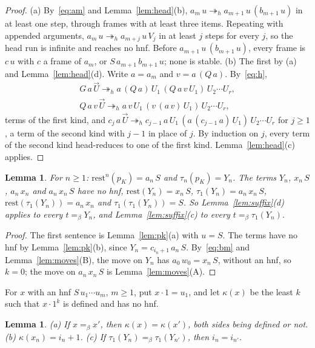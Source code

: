 \documentclass[11pt]{amsart}
\newtheorem{lemma}[theorem]{Lemma}
\theoremstyle{definition}
\newcommand{\hred}{\twoheadrightarrow_h}
\newcommand{\conv}{=_\beta}
\newcommand{\rest}{\mathrm{rest}}
\newcommand{\pK}{p_K}
\newcommand{\vU}{\vec U}
\begin{document}
\begin{proof}
(a) By~\eqref{eq:am} and Lemma~\ref{lem:head}(b), $a_m\,u\hred a_{m+1}\,u\,(b_{m+1}\,u)$ in at least
one step, through frames with at least three items. Repeating with appended arguments,
$a_m\,u\hred a_{m+j}\,u\,V_j$ in at least $j$ steps for every $j$, so the head run is infinite and
reaches no hnf. Before $a_{m+1}\,u\,(b_{m+1}\,u)$, every frame is $c\,u$ with $c$ a frame of $a_m$, or
$S\,a_{m+1}\,b_{m+1}\,u$; none is stable. (b) The first by (a) and Lemma~\ref{lem:head}(d). Write
$a=a_m$ and $v=a\,(Q\,a)$. By~\eqref{eq:h},
\begin{gather*}
G\,a\,\vU\hred a\,(Q\,a)\,U_1\,(Q\,a\,v\,U_1)\,U_2\cdots U_r,\\
Q\,a\,v\,\vU\hred a\,v\,U_1\,(v\,(a\,v)\,U_1)\,U_2\cdots U_r,
\end{gather*}
terms of the first kind, and
$c_{j}\,a\,\vU\hred c_{j-1}\,a\,U_1\,(a\,(c_{j-1}\,a)\,U_1)\,U_2\cdots U_r$ for $j\ge1$, a term of
the second kind with $j-1$ in place of $j$. By induction on $j$, every term of the second kind
head-reduces to one of the first kind. Lemma~\ref{lem:head}(c) applies.
\end{proof}

\begin{lemma}\label{lem:teeth}
For $n\ge1$: $\rest^{n}(\pK)=a_{n}\,S$ and $\tau_n(\pK)=Y_n$. The terms $Y_n$, $x_n\,S$, $a_n\,x_n$
and $a_n\,x_n\,S$ have no hnf, $\rest(Y_n)=x_n\,S$, $\tau_1(Y_n)=a_n\,x_n\,S$,
$\rest(\tau_1(Y_n))=a_n\,x_n$ and $\tau_1(\tau_1(Y_n))=S$. So Lemma~\ref{lem:suffix}\textup{(d)}
applies to every $t\conv Y_n$, and Lemma~\ref{lem:suffix}\textup{(c)} to every $t\conv\tau_1(Y_n)$.
\end{lemma}

\begin{proof}
The first sentence is Lemma~\ref{lem:pk}(a) with $u=S$. The terms have no hnf by
Lemma~\ref{lem:pk}(b), since $Y_n=c_{i_n+1}\,a_n\,S$. By~\eqref{eq:bm} and Lemma~\ref{lem:moves}(B),
the move on $Y_n$ has $a_0\,w_0=x_n\,S$, without an hnf, so $k=0$; the move on $a_n\,x_n\,S$ is
Lemma~\ref{lem:moves}(A).
\end{proof}

For $x$ with an hnf $S\,u_1\cdots u_m$, $m\ge1$, put $x\cdot1=u_1$, and let $\kappa(x)$ be the least
$k$ such that $x\cdot1^k$ is defined and has no hnf.

\begin{lemma}\label{lem:index}
\textup{(a)} If $x\conv x'$, then $\kappa(x)=\kappa(x')$, both sides being defined or not.
\textup{(b)} $\kappa(x_n)=i_n+1$. \textup{(c)} If $\tau_1(Y_n)\conv\tau_1(Y_{n'})$, then $i_n=i_{n'}$.
\end{lemma}
\end{document}
